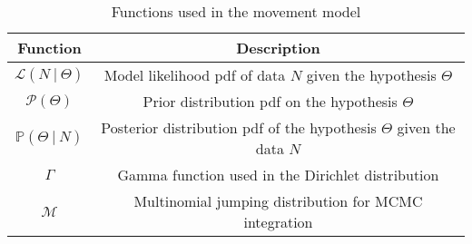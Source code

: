 \documentclass[12pt]{article}
\newcommand{\cL}{\mathcal{L}}
\newcommand{\PP}{\mathbb{P}}
\newcommand{\cP}{\mathcal{P}}
\newcommand{\cM}{\mathcal{M}}
\begin{document}
\begin{table}[!h]
\begin{center}
\begin{tabular}{c | c}
\hline
Function & Description \\
\hline
$\cL(N ~|~ \Theta )$ & Model likelihood pdf of data $N$ given the hypothesis $\Theta$ \\
$\cP(\Theta)$ & Prior distribution pdf on the hypothesis $\Theta$ \\
$\PP(\Theta ~|~ N)$ & Posterior distribution pdf of the hypothesis $\Theta$ given the data $N$ \\
$\Gamma$ & Gamma function used in the Dirichlet distribution \\
$\cM$ & Multinomial jumping distribution for MCMC integration \\
\hline
\end{tabular}
\caption{Functions used in the movement model}\label{tab:functions}
\end{center}
\end{table}



\end{document}

